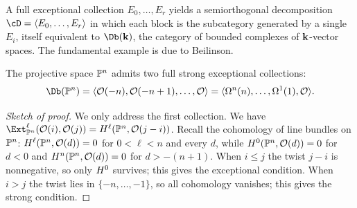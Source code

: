\documentclass{amsart}
\begin{document}
A full exceptional collection $E_0,\dots,E_r$ yields a semiorthogonal decomposition $\cD = \langle E_0,\dots,E_r\rangle$ in which each block is the subcategory generated by a single $E_i$, itself equivalent to $\Db(\kk)$, the category of bounded complexes of ${\bf k}$-vector spaces. The fundamental example is due to Beilinson.

\begin{thm}\label{thm:beilinsonFSEC}
  The projective space $\mathbb P^n$ admits two full strong exceptional collections:
  \[ \Db(\PP^n) = \langle \cO(-n),\cO(-n+1),\dots,\cO\rangle = \langle \Omega^n(n),\dots,\Omega^1(1),\cO\rangle. \]
\end{thm}

\begin{proof}[Sketch of proof]
  We only address the first collection. We have $\Ext^\ell_{\PP^n}(\cO(i),\cO(j))=\HH^\ell(\PP^n,\cO(j-i))$. Recall the cohomology of line bundles on $\mathbb P^n$: $H^\ell(\mathbb P^n,{\mathcal O}(d))=0$ for $0<\ell<n$ and every $d$, while $H^0(\mathbb P^n,{\mathcal O}(d))=0$ for $d<0$ and $H^n(\mathbb P^n,{\mathcal O}(d))=0$ for $d>-(n+1)$. When $i\le j$ the twist $j-i$ is nonnegative, so only $H^0$ survives; this gives the exceptional condition. When $i>j$ the twist lies in $\{-n,\dots,-1\}$, so all cohomology vanishes; this gives the strong condition. %

\end{proof}
\end{document}
